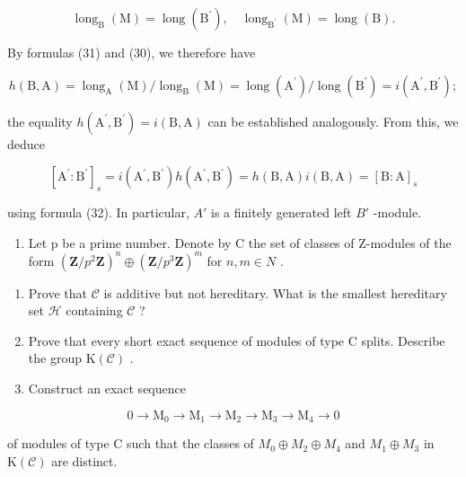 \[
\operatorname{long} _ {\mathrm{B}} (\mathrm{M}) = \operatorname{long} \left(\mathrm{B} ^ {\prime}\right), \quad \operatorname{long} _ {\mathrm{B} ^ {\prime}} (\mathrm{M}) = \operatorname{long} (\mathrm{B}).
\]

By formulas (31) and (30), we therefore have

\[
h (\mathrm{B}, \mathrm{A}) = \operatorname{long} _ {\mathrm{A}} (\mathrm{M}) / \operatorname{long} _ {\mathrm{B}} (\mathrm{M}) = \operatorname{long} \left(\mathrm{A} ^ {\prime}\right) / \operatorname{long} \left(\mathrm{B} ^ {\prime}\right) = i \left(\mathrm{A} ^ {\prime}, \mathrm{B} ^ {\prime}\right);
\]

the equality \(h(\mathrm{A}^{\prime},\mathrm{B}^{\prime}) = i(\mathrm{B},\mathrm{A})\) can be established analogously. From this, we deduce

\[
[ \mathrm{A} ^ {\prime}: \mathrm{B} ^ {\prime} ] _ {s} = i (\mathrm{A} ^ {\prime}, \mathrm{B} ^ {\prime}) h (\mathrm{A} ^ {\prime}, \mathrm{B} ^ {\prime}) = h (\mathrm{B}, \mathrm{A}) i (\mathrm{B}, \mathrm{A}) = [ \mathrm{B}: \mathrm{A} ] _ {s}
\]

using formula (32). In particular, \(A'\) is a finitely generated left \(B'\) -module.


\begin{enumerate}
\def\labelenumi{\arabic{enumi})}
\tightlist
\item
  Let p be a prime number. Denote by C the set of classes of Z-modules of the form \((\mathbf{Z}/p^{2}\mathbf{Z})^{n} \oplus (\mathbf{Z}/p^{3}\mathbf{Z})^{m}\) for \(n, m \in N\) .
\end{enumerate}

\begin{enumerate}
\def\labelenumi{\alph{enumi})}
\item
  Prove that \(\mathcal{C}\) is additive but not hereditary. What is the smallest hereditary set \(\mathcal{H}\) containing \(\mathcal{C}\) ?
\item
  Prove that every short exact sequence of modules of type C splits. Describe the group \(\mathrm{K}(\mathcal{C})\) .
\item
  Construct an exact sequence
\end{enumerate}

\[
0 \to \mathrm{M} _ {0} \to \mathrm{M} _ {1} \to \mathrm{M} _ {2} \to \mathrm{M} _ {3} \to \mathrm{M} _ {4} \to 0
\]

of modules of type C such that the classes of \(M_{0} \oplus M_{2} \oplus M_{4}\) and \(M_{1} \oplus M_{3}\) in \(\mathrm{K}(\mathcal{C})\) are distinct.

